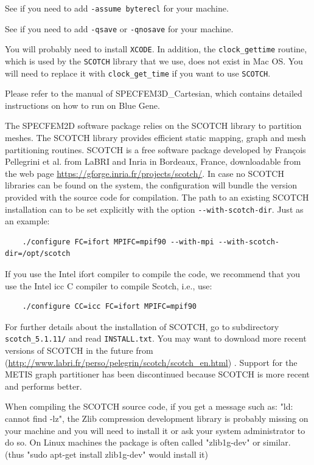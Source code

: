 \documentclass[oneside,english,onecolumn,letterpaper]{book}
\newcommand{\urlwithparentheses}[1]{(\url{#1})}
\begin{document}
\begin{description}[font=\ttfamily]
\item [Intel ifort compiler] See if you need to add \texttt{-assume byterecl} for your machine.
\item [IBM compiler] See if you need to add \texttt{-qsave} or \texttt{-qnosave} for your machine.
\item [Mac OS] You will probably need to install \texttt{XCODE}.
In addition, the \texttt{clock\_gettime} routine, which is used by the \texttt{SCOTCH} library that we use, does not exist in Mac OS.
You will need to replace it with \texttt{clock\_get\_time} if you want to use \texttt{SCOTCH}.
\item [IBM Blue Gene machines] Please refer to the manual of SPECFEM3D\_Cartesian, which contains detailed instructions on how to run on Blue Gene.
\end{description}

The SPECFEM2D software package relies on the SCOTCH library to partition meshes.
The SCOTCH library \citep{PeRo96}
provides efficient static mapping, graph and mesh partitioning routines. SCOTCH is a free software package developed by
Fran\c{c}ois Pellegrini et al. from LaBRI and Inria in Bordeaux, France, downloadable from the web page \url{https://gforge.inria.fr/projects/scotch/}.
In case no SCOTCH libraries can be found on the system, the configuration will bundle the version provided with the source code for compilation.
The path to an existing SCOTCH installation can to be set explicitly with the option \texttt{-{}-with-scotch-dir}.
Just as an example:
%
\begin{verbatim}
    ./configure FC=ifort MPIFC=mpif90 --with-mpi --with-scotch-dir=/opt/scotch
\end{verbatim}
%
If you use the Intel ifort compiler to compile the code, we recommend that you use the Intel icc C compiler to compile Scotch, i.e., use:
%
\begin{verbatim}
    ./configure CC=icc FC=ifort MPIFC=mpif90
\end{verbatim}
%
For further details about the installation of SCOTCH,
go to subdirectory \texttt{scotch\_5.1.11/} and read \texttt{INSTALL.txt}. You may want to download more recent versions of SCOTCH in the future from \urlwithparentheses{http://www.labri.fr/perso/pelegrin/scotch/scotch_en.html} . Support for the METIS graph partitioner has been discontinued because SCOTCH is more recent and performs better.

When compiling the SCOTCH source code, if you get a message such as: "ld: cannot find -lz", 
the Zlib compression development library is probably missing on your machine and you will need to install it or ask your system administrator to 
do so. On Linux machines the package is often called "zlib1g-dev" or similar. (thus "sudo apt-get install zlib1g-dev" would install it)
\end{document}
